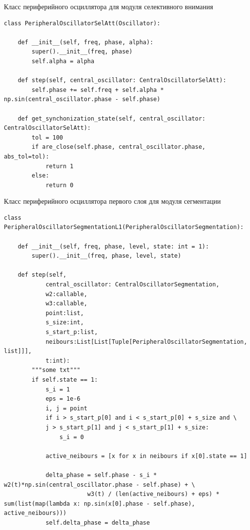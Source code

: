 \documentclass[14pt, russian]{scrartcl}
\begin{document}
\begin{listing}[!htt]
    \caption{Класс периферийного осциллятора для модуля селективного внимания}
    \label{lst:contour_extr_sobel}
    \begin{verbatim}
class PeripheralOscillatorSelAtt(Oscillator):

    def __init__(self, freq, phase, alpha):
        super().__init__(freq, phase)
        self.alpha = alpha

    def step(self, central_oscillator: CentralOscillatorSelAtt):
        self.phase += self.freq + self.alpha * np.sin(central_oscillator.phase - self.phase)

    def get_synchonization_state(self, central_oscillator: CentralOscillatorSelAtt):
        tol = 100
        if are_close(self.phase, central_oscillator.phase, abs_tol=tol):
            return 1
        else:
            return 0
    \end{verbatim}
\end{listing}

\begin{listing}[!htt]
    \caption{Класс периферийного осциллятора первого слоя для модуля сегментации}
    \label{lst:contour_extr_sobel}
    \begin{verbatim}
class PeripheralOscillatorSegmentationL1(PeripheralOscillatorSegmentation):

    def __init__(self, freq, phase, level, state: int = 1):
        super().__init__(freq, phase, level, state)

    def step(self, 
            central_oscillator: CentralOscillatorSegmentation, 
            w2:callable, 
            w3:callable, 
            point:list, 
            s_size:int, 
            s_start_p:list,
            neibours:List[List[Tuple[PeripheralOscillatorSegmentation, list]]],
            t:int):
        """some txt"""
        if self.state == 1:
            s_i = 1
            eps = 1e-6
            i, j = point
            if i > s_start_p[0] and i < s_start_p[0] + s_size and \
            j > s_start_p[1] and j < s_start_p[1] + s_size:
                s_i = 0
            
            active_neibours = [x for x in neibours if x[0].state == 1]
            
            delta_phase = self.phase - s_i * w2(t)*np.sin(central_oscillator.phase - self.phase) + \
                        w3(t) / (len(active_neibours) + eps) * sum(list(map(lambda x: np.sin(x[0].phase - self.phase), active_neibours)))
            self.delta_phase = delta_phase   
    \end{verbatim}
\end{listing}
\end{document}
